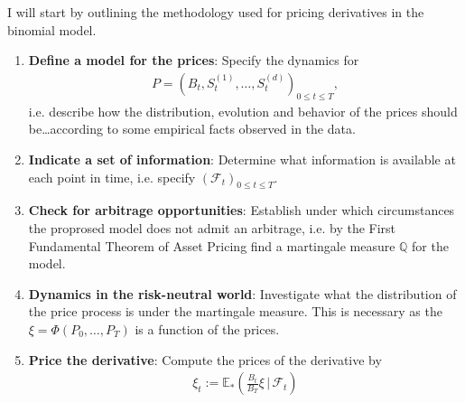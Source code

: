 \documentclass{beamer}
\numberwithin{equation}{section}
\begin{document}
\begin{frame}\frametitle{{\normalsize \secname} \\ {\large \subsecname}}
    I will start by outlining the methodology used for pricing derivatives in the binomial model.
    \begingroup
    \footnotesize
    \begin{enumerate}
        \item \textbf{Define a model for the prices}: Specify the dynamics for
        \begin{align}
            P =
            \left(
                B_t, S_t^{(1)}, \ldots, S_t^{(d)}
            \right)_{0 \leq t \leq T},
        \end{align}
        i.e. describe how the distribution, evolution and behavior of the prices should be\dots according to some empirical facts observed in the data.
        \item \textbf{Indicate a set of information}: Determine what information is available at each point in time, i.e. specify $\left(\mathscr{F}_t\right)_{0 \leq t \leq T}$.
        \item \textbf{Check for arbitrage opportunities}: Establish under which circumstances the proprosed model does not admit an arbitrage, i.e. by the First Fundamental Theorem of Asset Pricing find a martingale measure $\mathbb{Q}$ for the model.
        \item \textbf{Dynamics in the risk-neutral world}: Investigate what the distribution of the price process is under the martingale measure.
        This is necessary as the $\xi = \Phi(P_0, \dots, P_T)$ is a function of the prices.
        \item \textbf{Price the derivative}: Compute the prices of the derivative by
        \begin{align}
            \xi_t := \mathbb{E}_*\left(\frac{B_t}{B_T}\xi \, \bigg| \, \mathscr{F}_t\right)
        \end{align}
    \end{enumerate}
    \endgroup
\end{frame}

\end{document}
